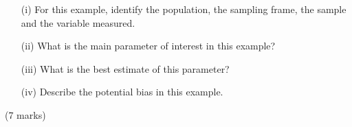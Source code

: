 \documentclass[]{article}
\begin{document}
\begin{itemize}
\item[(i)] For this example, identify the population, the sampling frame, the sample and the variable measured.

\item[(ii)] What is the main parameter of interest in this example?

\item[(iii)] What is the best estimate of this parameter?

\item[(iv)] Describe the potential bias in this example.
\end{itemize}
(7 marks)
\end{document}
